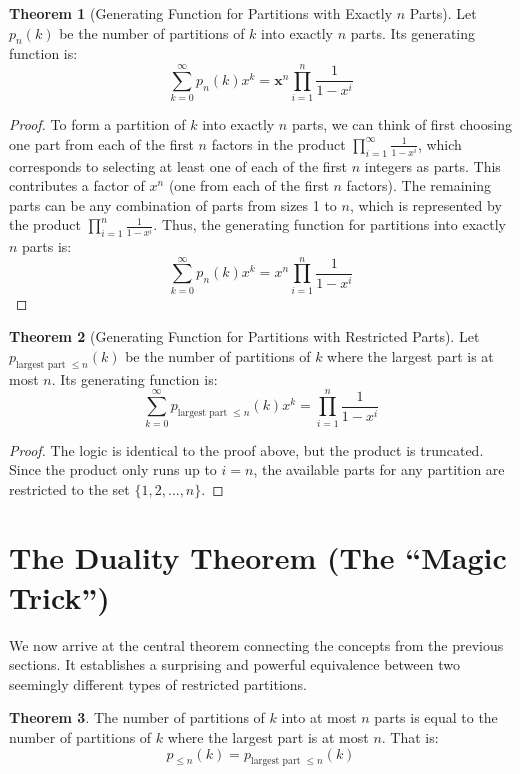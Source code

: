 \documentclass{article}
\theoremstyle{definition}
\newtheorem{theorem}{Theorem}
\begin{document}
\begin{theorem}[Generating Function for Partitions with Exactly $n$ Parts]
  Let $p_n(k)$ be the number of partitions of $k$ into exactly $n$ parts. Its generating function is:
  $$
  \sum_{k=0}^{\infty} p_n(k) x^k=\boldsymbol{x}^n \prod_{i=1}^n \frac{1}{1-x^i}
  $$
\end{theorem}
\begin{proof}
  To form a partition of $k$ into exactly $n$ parts, we can think of first choosing one part from each of the first $n$ factors in the product $\prod_{i=1}^{\infty} \frac{1}{1-x^i}$, which corresponds to selecting at least one of each of the first $n$ integers as parts. This contributes a factor of $x^n$ (one from each of the first $n$ factors). The remaining parts can be any combination of parts from sizes 1 to $n$, which is represented by the product $\prod_{i=1}^{n} \frac{1}{1-x^i}$. Thus, the generating function for partitions into exactly $n$ parts is:
  $$ \sum_{k=0}^{\infty} p_n(k) x^k = x^n \prod_{i=1}^{n} \frac{1}{1-x^i} $$  
\end{proof}


\begin{theorem}[Generating Function for Partitions with Restricted Parts]
  Let $p_{\text{largest part } \le n}(k)$ be the number of partitions of $k$ where the largest part is at most $n$. Its generating function is:
  $$ \sum_{k=0}^{\infty} p_{\text{largest part } \le n}(k)x^k = \prod_{i=1}^{n} \frac{1}{1-x^i} $$
\end{theorem}
\begin{proof}
  The logic is identical to the proof above, but the product is truncated. Since the product only runs up to $i=n$, the available parts for any partition are restricted to the set $\{1, 2, \dots, n\}$.
\end{proof}


\section{The Duality Theorem (The ``Magic Trick'')}

We now arrive at the central theorem connecting the concepts from the previous sections. It establishes a surprising and powerful equivalence between two seemingly different types of restricted partitions.

\begin{theorem}\label{thm:duality}
  The number of partitions of $k$ into at most $n$ parts is equal to the number of partitions of $k$ where the largest part is at most $n$. That is:
  $$ p_{\le n}(k) = p_{\text{largest part } \le n}(k) $$
\end{theorem}
\end{document}
